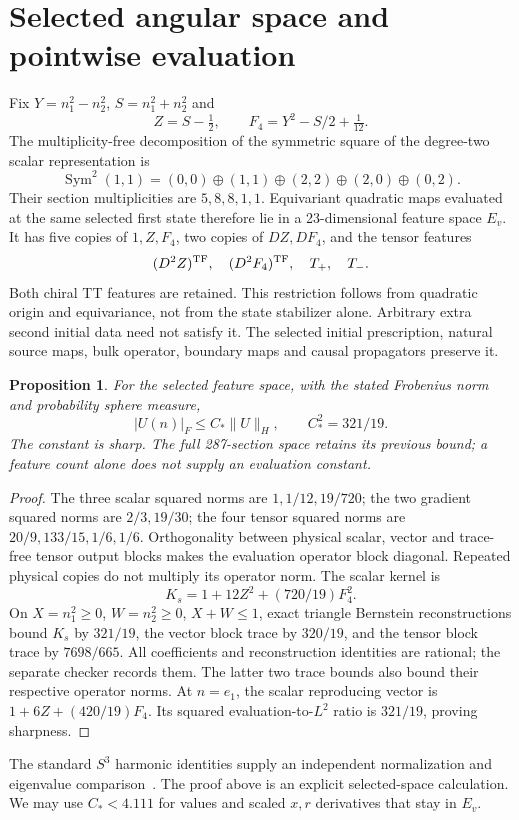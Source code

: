 \documentclass[11pt]{article}
\newtheorem{proposition}{Proposition}
\newcommand{\Ev}{E_v}
\begin{document}
\section{Selected angular space and pointwise evaluation}
Fix $Y=n_1^2-n_2^2$, $S=n_1^2+n_2^2$ and
\[
Z=S-\tfrac12,\qquad F_4=Y^2-S/2+\tfrac1{12}.
\]
The multiplicity-free decomposition of the symmetric square of the degree-two scalar representation is
\[
\operatorname{Sym}^2(1,1)=(0,0)\oplus(1,1)\oplus(2,2)\oplus(2,0)\oplus(0,2).
\]
Their section multiplicities are $5,8,8,1,1$. Equivariant quadratic maps evaluated at the same selected first state therefore lie in a 23-dimensional feature space $\Ev$. It has five copies of $1,Z,F_4$, two copies of $DZ,DF_4$, and the tensor features
\[
(D^2Z)^{\rm TF},\quad(D^2F_4)^{\rm TF},\quad T_+,\quad T_-.
\]
Both chiral TT features are retained. This restriction follows from quadratic origin and equivariance, not from the state stabilizer alone. Arbitrary extra second initial data need not satisfy it. The selected initial prescription, natural source maps, bulk operator, boundary maps and causal propagators preserve it.

\begin{proposition}
For the selected feature space, with the stated Frobenius norm and probability sphere measure,
\[
|U(n)|_F\le C_*\|U\|_H,\qquad C_*^2=321/19.
\]
The constant is sharp. The full 287-section space retains its previous bound; a feature count alone does not supply an evaluation constant.
\end{proposition}
\begin{proof}
The three scalar squared norms are $1,1/12,19/720$; the two gradient squared norms are $2/3,19/30$; the four tensor squared norms are $20/9,133/15,1/6,1/6$. Orthogonality between physical scalar, vector and trace-free tensor output blocks makes the evaluation operator block diagonal. Repeated physical copies do not multiply its operator norm. The scalar kernel is
\[
K_s=1+12Z^2+(720/19)F_4^2.
\]
On $X=n_1^2\ge0$, $W=n_2^2\ge0$, $X+W\le1$, exact triangle Bernstein reconstructions bound $K_s$ by $321/19$, the vector block trace by $320/19$, and the tensor block trace by $7698/665$. All coefficients and reconstruction identities are rational; the separate checker records them. The latter two trace bounds also bound their respective operator norms. At $n=e_1$, the scalar reproducing vector is $1+6Z+(420/19)F_4$. Its squared evaluation-to-$L^2$ ratio is $321/19$, proving sharpness.
\end{proof}
The standard $S^3$ harmonic identities supply an independent normalization and eigenvalue comparison~\cite{LTZ}. The proof above is an explicit selected-space calculation. We may use $C_*<4.111$ for values and scaled $x,r$ derivatives that stay in $\Ev$.
\end{document}

